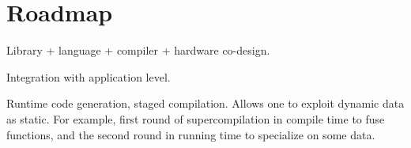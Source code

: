 \documentclass[10pt,conference]{IEEEtran}
\newcommand\todo[1]{{\color{red}#1}}
\begin{document}

\section{Roadmap}

Library + language + compiler + hardware co-design.

Integration with application level.

Runtime code generation, staged compilation. 
Allows one to exploit dynamic data as static. 
For example, first round of supercompilation in compile time to fuse functions, and the second round in running time to specialize on some data. 






\end{document}

